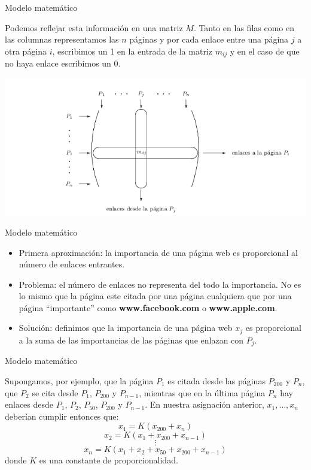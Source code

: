\documentclass[ignorenonframetext,aspectratio=43,]{beamer}
\begin{document}
\begin{frame}{Modelo matemático}
\begin{center}
Podemos reflejar esta información en una matriz $M$. Tanto en las filas como en las columnas representamos las $n$ páginas y por cada enlace entre una página $j$ a otra página $i$, escribimos un 1 en la entrada de la matriz $m_{ij}$ y en el caso de que no haya enlace escribimos un 0.

\includegraphics[width=1.0\textwidth]{./img/matriz}
\end{center}
\end{frame}

\begin{frame}{Modelo matemático}
\begin{itemize}
\item Primera aproximación: la importancia de una página web es proporcional al número de enlaces entrantes.
\item Problema: el número de enlaces no representa del todo la importancia. No es lo mismo que la página este citada por una página cualquiera que por una página ``importante'' como \textbf{www.facebook.com} o \textbf{www.apple.com}.
\item Solución: definimos que la importancia de una página web $x_j$ es proporcional a la suma de las importancias de las páginas que enlazan con $P_j$.

\end{itemize}

\end{frame}

\begin{frame}{Modelo matemático}
\begin{center}
Supongamos, por ejemplo, que la página $P_1$ es citada desde las páginas $P_{200}$ y $P_n$, que $P_2$ se cita desde $P_1$, $P_{200}$ y $P_{n-1}$, mientras que en la última página $P_n$ hay enlaces desde $P_1$, $P_2$, $P_{50}$, $P_{200}$ y $P_{n-1}$. En nuestra asignación anterior, $x_1, \dots, x_n$ deberían cumplir entonces que:
$$ x_1 = K(x_{200} + x_n) $$
$$ x_2 = K(x_1 + x_{200} + x_{n-1})$$
$$ \vdots $$
$$ x_n = K(x_1 + x_2 + x_{50} + x_{200} + x_{n-1})$$
donde $K$ es una constante de proporcionalidad.
\end{center}

\end{frame}
\end{document}
